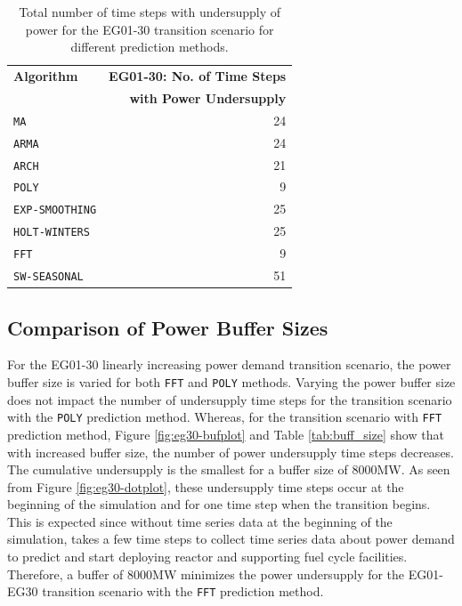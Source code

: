\begin{table}[]
    \doublespacing
	\centering
        \caption{Total number of time steps with undersupply of power for the 
        EG01-30 transition scenario for different prediction methods.}
		\label{tab:all-power}
		\small
        \begin{tabular}{lr}
		\hline
        \textbf{Algorithm} & \textbf{EG01-30: No. of Time Steps} \\ 
        & \textbf{with Power Undersupply} \\ \hline
		\texttt{MA}     		& 24 \\ 
		\texttt{ARMA}     	    & 24\\ 
		\texttt{ARCH}     	    & 21\\ 
		\texttt{POLY}      		&  9\\ 
		\texttt{EXP-SMOOTHING} 	& 25\\ 
		\texttt{HOLT-WINTERS}  	& 25\\ 
		\texttt{FFT}       		& 9\\ 
		\texttt{SW-SEASONAL}    & 51\\ \hline
	\end{tabular}
\end{table}


\subsection{Comparison of Power Buffer Sizes}
For the EG01-30 linearly increasing power demand 
transition scenario, the power buffer size is varied
for both \texttt{FFT} and \texttt{POLY} methods. 
Varying the power buffer size does not impact the number of 
undersupply time steps for the transition scenario 
with the \texttt{POLY} prediction method.
Whereas, for the transition scenario with \texttt{FFT} prediction method, 
Figure \ref{fig:eg30-bufplot} and Table \ref{tab:buff_size} 
show that with increased buffer size, the number of 
power undersupply time steps decreases. 
The cumulative undersupply is the smallest for a buffer 
size of 8000MW.  
As seen from Figure \ref{fig:eg30-dotplot}, these undersupply time 
steps occur at the beginning of the simulation and for one 
time step when the transition begins. 
This is expected since without time series data 
at the beginning of the simulation, \deploy takes a few 
time steps to collect time series data about power demand 
to predict and start deploying reactor and supporting 
fuel cycle facilities. 
Therefore, a buffer of 8000MW minimizes 
the power undersupply for the EG01-EG30 transition scenario
with the \texttt{FFT} prediction method.


